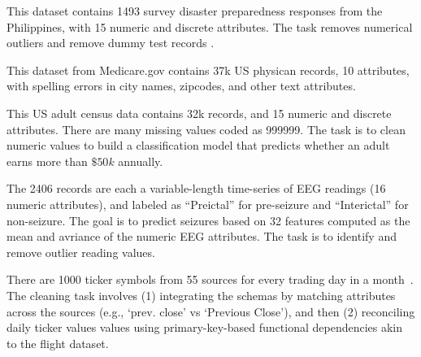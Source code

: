 

 This dataset contains 1493 survey disaster preparedness responses from the Philippines, with 15 numeric and discrete attributes. The task removes numerical outliers and remove dummy test records .

 This dataset from Medicare.gov contains 37k US physican records, 10 attributes, with spelling errors in city names, zipcodes, and other text attributes. 

 This US adult census data contains 32k records, and 15 numeric and discrete attributes.  There are many missing values coded as 999999.  The task is to clean numeric values to build a classification model that predicts whether an adult earns more than $\$50k$ annually. 

  The 2406 records are each a variable-length time-series of EEG readings (16 numeric attributes), and labeled as ``Preictal'' for pre-seizure and ``Interictal'' for non-seizure.  The goal is to predict seizures based on 32 features computed as the mean and avriance of the numeric EEG attributes.  The task is to identify and remove outlier reading values.  


 There are 1000 ticker symbols from 55 sources for every trading day in a month~\cite{data-flights}.  The cleaning task involves (1) integrating the schemas by matching attributes across the sources (e.g., `prev. close' vs `Previous Close'), and then (2) reconciling daily ticker values values using primary-key-based functional dependencies akin to the flight dataset.

